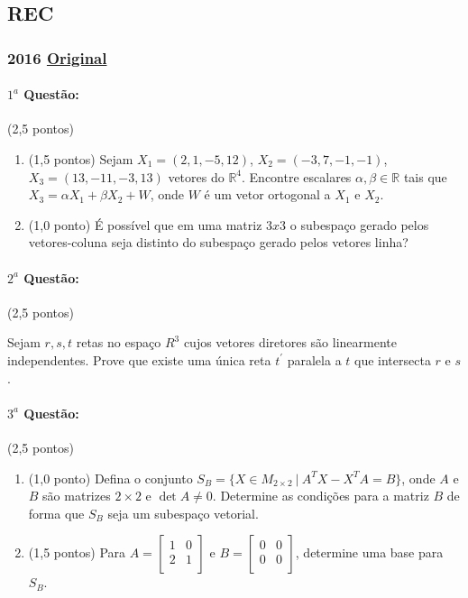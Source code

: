 \documentclass[12pt,a4paper]{article}
\newcommand{\original}[1]{\tiny \href{#1}{Original} \normalsize}
\begin{document}
\subsection{REC}

\subsubsection{2016 \original{https://drive.google.com/file/d/1P1qzC2gnhEmUvseWBoZeuXIoZxWfk0HX/view?usp=sharing}}

\paragraph{$1^a$ Questão:} (2,5 pontos)

\begin{enumerate}[label=\alph*)]
\item (1,5 pontos) Sejam $X_1 = (2,1,-5,12)$, $X_2=(-3,7,-1,-1)$, $X_3=(13,-11,-3,13)$ vetores do $\mathbb{R}^4$. Encontre escalares $\alpha,\beta \in \mathbb{R}$
tais que $X_3=\alpha X_1 + \beta X_2 + W$, onde $W$ é um vetor ortogonal a $X_1$ e $X_2$.
\item (1,0 ponto) É possível que em uma matriz $3x3$ o subespaço gerado pelos vetores-coluna seja distinto do subespaço gerado pelos vetores linha? 
\end{enumerate}

\paragraph{$2^a$ Questão:} (2,5 pontos)

Sejam $r,s,t$ retas no espaço $R^3$ cujos vetores diretores são linearmente independentes. Prove que existe uma única reta $t^\prime$  paralela a $t$
que intersecta $r$ e $s$.

\paragraph{$3^a$ Questão:} (2,5 pontos)

\begin{enumerate}[label=\alph*)]
\item (1,0 ponto) Defina o conjunto $S_B=\{X \in M_{2\times 2}\ | \ A^TX-X^TA=B \}$, onde $A$ e $B$ são matrizes $2 \times 2$ 
e $\det{A}\neq 0$. Determine as condições para a matriz $B$ de forma que $S_B$ seja um subespaço vetorial.
\item (1,5 pontos) Para 
$A=\left[
\begin{array}{cc}
1 & 0 \\
2 & 1 \\
\end{array}
\right]$ e 
$B=
\left[
\begin{array}{cc}
0 & 0 \\
0 & 0 \\
\end{array}
\right]$, determine uma base para $S_B$.
\end{enumerate}
\end{document}
